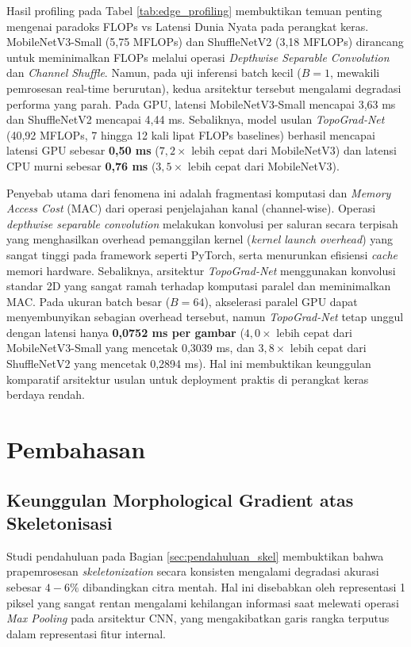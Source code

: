 \documentclass[journal]{IEEEtran}
\begin{document}
Hasil profiling pada Tabel \ref{tab:edge_profiling} membuktikan temuan penting mengenai paradoks FLOPs vs Latensi Dunia Nyata pada perangkat keras. MobileNetV3-Small (5,75 MFLOPs) dan ShuffleNetV2 (3,18 MFLOPs) dirancang untuk meminimalkan FLOPs melalui operasi \textit{Depthwise Separable Convolution} dan \textit{Channel Shuffle}. Namun, pada uji inferensi batch kecil ($B=1$, mewakili pemrosesan real-time berurutan), kedua arsitektur tersebut mengalami degradasi performa yang parah. Pada GPU, latensi MobileNetV3-Small mencapai 3,63 ms dan ShuffleNetV2 mencapai 4,44 ms. Sebaliknya, model usulan \textit{TopoGrad-Net} (40,92 MFLOPs, 7 hingga 12 kali lipat FLOPs baselines) berhasil mencapai latensi GPU sebesar \textbf{0,50 ms} ($7{,}2\times$ lebih cepat dari MobileNetV3) dan latensi CPU murni sebesar \textbf{0,76 ms} ($3{,}5\times$ lebih cepat dari MobileNetV3).

Penyebab utama dari fenomena ini adalah fragmentasi komputasi dan \textit{Memory Access Cost} (MAC) dari operasi penjelajahan kanal (channel-wise). Operasi \textit{depthwise separable convolution} melakukan konvolusi per saluran secara terpisah yang menghasilkan overhead pemanggilan kernel (\textit{kernel launch overhead}) yang sangat tinggi pada framework seperti PyTorch, serta menurunkan efisiensi \textit{cache} memori hardware. Sebaliknya, arsitektur \textit{TopoGrad-Net} menggunakan konvolusi standar 2D yang sangat ramah terhadap komputasi paralel dan meminimalkan MAC. Pada ukuran batch besar ($B=64$), akselerasi paralel GPU dapat menyembunyikan sebagian overhead tersebut, namun \textit{TopoGrad-Net} tetap unggul dengan latensi hanya \textbf{0,0752 ms per gambar} ($4{,}0\times$ lebih cepat dari MobileNetV3-Small yang mencetak 0,3039 ms, dan $3{,}8\times$ lebih cepat dari ShuffleNetV2 yang mencetak 0,2894 ms). Hal ini membuktikan keunggulan komparatif arsitektur usulan untuk deployment praktis di perangkat keras berdaya rendah.



\section{Pembahasan}
\label{sec:pembahasan}

\subsection{Keunggulan Morphological Gradient atas Skeletonisasi}
Studi pendahuluan pada Bagian \ref{sec:pendahuluan_skel} membuktikan bahwa prapemrosesan \textit{skeletonization} secara konsisten mengalami degradasi akurasi sebesar $4{-}6\%$ dibandingkan citra mentah. Hal ini disebabkan oleh representasi 1 piksel yang sangat rentan mengalami kehilangan informasi saat melewati operasi \textit{Max Pooling} pada arsitektur CNN, yang mengakibatkan garis rangka terputus dalam representasi fitur internal.
\end{document}
